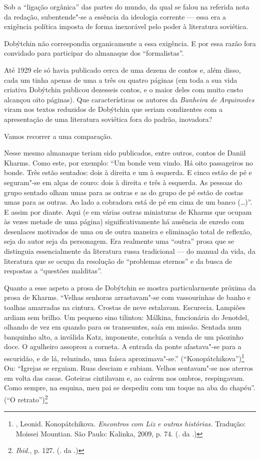 Sob a ``ligação orgânica'' das partes do mundo, da qual se falou na
referida nota da redação, subentende"-se a essência da ideologia corrente
--- essa era a exigência política imposta de forma inexorável pelo poder
à literatura soviética.

Dobýtchin não correspondia organicamente a essa exigência. E por essa
razão fora convidado para participar do almanaque dos ``formalistas''.

Até 1929 ele só havia publicado cerca de uma dezena de contos e, além
disso, cada um tinha apenas de uma a três ou quatro páginas (em toda a
sua vida criativa Dobýtchin publicou dezesseis contos, e o maior deles
com muito custo alcançou oito páginas). Que características os autores
da \emph{Banheira de Arquimedes} viram nos textos reduzidos de Dobýtchin
que seriam condizentes com a apresentação de uma literatura soviética
fora do padrão, inovadora?

Vamos recorrer a uma comparação.

Nesse mesmo almanaque teriam sido publicados, entre outros, contos de
Daniil Kharms. Como este, por exemplo: ``Um bonde vem vindo. Há oito
passageiros no bonde. Três estão sentados: dois à direita e um à
esquerda. E cinco estão de pé e seguram"-se em alças de couro: dois à
direita e três à esquerda. As pessoas do grupo sentado olham umas para
as outras e as do grupo de pé estão de costas umas para as outras. Ao
lado a cobradora está de pé em cima de um banco (\ldots{})''. E assim por
diante. Aqui (e em várias outras miniaturas de Kharms que ocupam às
vezes metade de uma página) significativamente há ausência de enredo com
desenlaces motivados de uma ou de outra maneira e eliminação total de
reflexão, seja do autor seja da personagem. Era realmente uma ``outra''
prosa que se distinguia essencialmente da literatura russa tradicional
--- do manual da vida, da literatura que se ocupa da resolução de
``problemas eternos'' e da busca de respostas a ``questões malditas''.

Quanto a esse aspeto a prosa de Dobýtchin se mostra particularmente
próxima da prosa de Kharms. ``Velhas senhoras arrastavam"-se com
vassourinhas de banho e toalhas amarradas na cintura. Crostas de neve
estalavam. Escurecia. Lampiões ardiam sem brilho. Um pequeno sino
tilintou: Málkina, funcionária do Jenotdel, olhando de vez em quando
para os transeuntes, saía em missão. Sentada num banquinho alto, a
inválida Katz, imponente, concluía a venda de um pãozinho doce. O
agulheiro assoprou a corneta. A entrada da ponte afastava"-se para a
escuridão, e de lá, reluzindo, uma faísca aproximava"-se.''
(``Konopátchikova'')\footnote{\scalebox{.8}{DOBÝTCHIN}, Leonid. Konopátchikova.
  \emph{Encontros com Liz e outras histórias.} Tradução: Moissei
  Mountian. São Paulo: Kalinka, 2009, p. 74. (\scalebox{.8}{N}. da \scalebox{.8}{E}.)} Ou: ``Igrejas
se erguiam. Ruas desciam e subiam. Velhos sentavam"-se nos aterros em
volta das casas. Goteiras cintilavam e, ao caírem nos ombros,
respingavam. Como sempre, na esquina, meu pai se despediu com um toque
na aba do chapéu''. (``O retrato'')\footnote{\emph{Ibid.}, p. 127. (\scalebox{.8}{N}.
  da \scalebox{.8}{E}.)}

